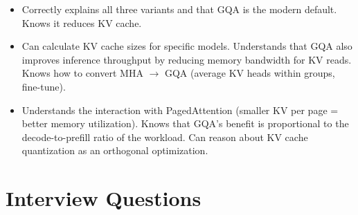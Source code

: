 \begin{interviewq}

\goodgreat
\begin{itemize}
    \item {} Correctly explains all three variants and that GQA is the modern default. Knows it reduces KV cache.
    \item {} Can calculate KV cache sizes for specific models. Understands that GQA also improves inference throughput by reducing memory bandwidth for KV reads. Knows how to convert MHA $\to$ GQA (average KV heads within groups, fine-tune).
    \item {} Understands the interaction with PagedAttention (smaller KV per page = better memory utilization). Knows that GQA's benefit is proportional to the decode-to-prefill ratio of the workload. Can reason about KV cache quantization as an orthogonal optimization.
\end{itemize}

\end{interviewq}

\section{Interview Questions}
\label{sec:attention_interview}

